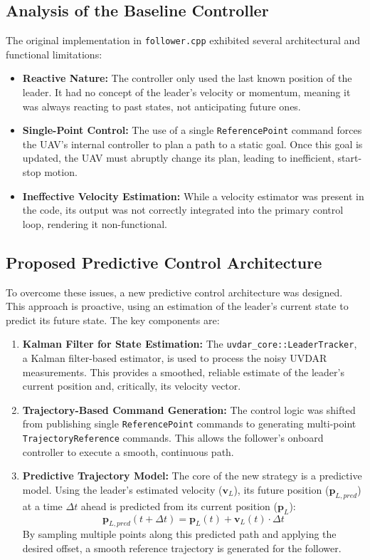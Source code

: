 \documentclass[11pt, a4paper]{article}
\begin{document}
\subsection{Analysis of the Baseline Controller}
The original implementation in \texttt{follower.cpp} exhibited several architectural and functional limitations:
\begin{itemize}
    \item \textbf{Reactive Nature:} The controller only used the last known position of the leader. It had no concept of the leader's velocity or momentum, meaning it was always reacting to past states, not anticipating future ones.
    \item \textbf{Single-Point Control:} The use of a single \texttt{ReferencePoint} command forces the UAV's internal controller to plan a path to a static goal. Once this goal is updated, the UAV must abruptly change its plan, leading to inefficient, start-stop motion.
    \item \textbf{Ineffective Velocity Estimation:} While a velocity estimator was present in the code, its output was not correctly integrated into the primary control loop, rendering it non-functional.
\end{itemize}

\subsection{Proposed Predictive Control Architecture}
To overcome these issues, a new predictive control architecture was designed. This approach is proactive, using an estimation of the leader's current state to predict its future state. The key components are:

\begin{enumerate}
    \item \textbf{Kalman Filter for State Estimation:} The \texttt{uvdar\_core::LeaderTracker}, a Kalman filter-based estimator, is used to process the noisy UVDAR measurements. This provides a smoothed, reliable estimate of the leader's current position and, critically, its velocity vector.
    
    \item \textbf{Trajectory-Based Command Generation:} The control logic was shifted from publishing single \texttt{ReferencePoint} commands to generating multi-point \texttt{TrajectoryReference} commands. This allows the follower's onboard controller to execute a smooth, continuous path.
    
    \item \textbf{Predictive Trajectory Model:} The core of the new strategy is a predictive model. Using the leader's estimated velocity ($\boldsymbol{v}_L$), its future position ($\boldsymbol{p}_{L,pred}$) at a time $\Delta t$ ahead is predicted from its current position ($\boldsymbol{p}_L$):
    \begin{equation}
        \boldsymbol{p}_{L,pred}(t + \Delta t) = \boldsymbol{p}_L(t) + \boldsymbol{v}_L(t) \cdot \Delta t
    \end{equation}
    By sampling multiple points along this predicted path and applying the desired offset, a smooth reference trajectory is generated for the follower.
\end{enumerate}
\end{document}
